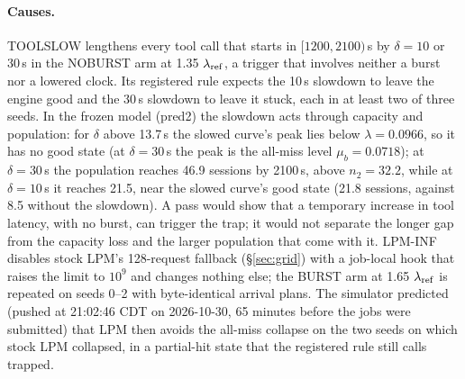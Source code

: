 \paragraph{Causes.} TOOLSLOW lengthens every tool call that starts in $[1200,2100)$\,s by $\delta=10$ or 30\,s in the NOBURST arm at 1.35 $\lambda_{\mathrm{ref}}$, a trigger that involves neither a burst nor a lowered clock. Its registered rule expects the 10\,s slowdown to leave the engine good and the 30\,s slowdown to leave it stuck, each in at least two of three seeds. In the frozen model (pred2) the slowdown acts through capacity and population: for $\delta$ above 13.7\,s the slowed curve's peak lies below $\lambda=0.0966$\sps, so it has no good state (at $\delta=30$\,s the peak is the all-miss level $\mu_b=0.0718$\sps); at $\delta=30$\,s the population reaches 46.9 sessions by 2100\,s, above $n_2=32.2$, while at $\delta=10$\,s it reaches 21.5, near the slowed curve's good state (21.8 sessions, against 8.5 without the slowdown). A pass would show that a temporary increase in tool latency, with no burst, can trigger the trap; it would not separate the longer gap from the capacity loss and the larger population that come with it. LPM-INF disables stock LPM's 128-request fallback (\S\ref{sec:grid}) with a job-local hook that raises the limit to $10^9$ and changes nothing else; the BURST arm at 1.65 $\lambda_{\mathrm{ref}}$ is repeated on seeds 0--2 with byte-identical arrival plans. The simulator predicted (pushed at 21:02:46 CDT on 2026-10-30, 65 minutes before the jobs were submitted) that LPM then avoids the all-miss collapse on the two seeds on which stock LPM collapsed, in a partial-hit state that the registered rule still calls trapped.

